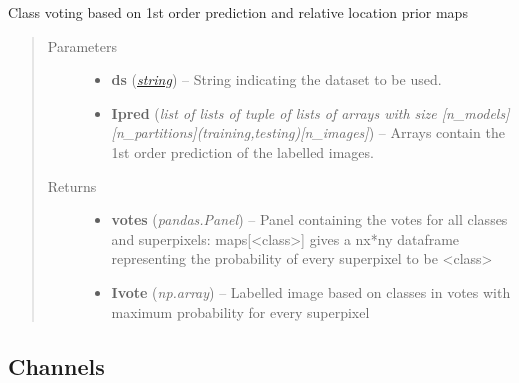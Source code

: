 \documentclass[letterpaper,10pt,english]{sphinxmanual}
\begin{document}
\begin{fulllineitems}
\label{classification:flamingo.classification.features.relativelocation.vote_image}
Class voting based on 1st order prediction and relative location prior maps
\begin{quote}\begin{description}
\item[{Parameters}] \leavevmode\begin{itemize}
\item {} 
\textbf{ds} (\href{http://docs.python.org/library/string.html\#module-string}{\emph{string}}) -- String indicating the dataset to be used.

\item {} 
\textbf{Ipred} (\emph{list of lists of tuple of lists of arrays with size {[}n\_models{]}{[}n\_partitions{]}(training,testing){[}n\_images{]}}) -- Arrays contain the 1st order prediction of the labelled images.

\end{itemize}

\item[{Returns}] \leavevmode
\begin{itemize}
\item {} 
\textbf{votes} (\emph{pandas.Panel}) --
Panel containing the votes for all classes and superpixels: maps{[}\textless{}class\textgreater{}{]}
gives a nx*ny dataframe representing the probability of every superpixel to be \textless{}class\textgreater{}

\item {} 
\textbf{Ivote} (\emph{np.array}) --
Labelled image based on classes in votes with maximum probability for every superpixel

\end{itemize}


\end{description}\end{quote}

\end{fulllineitems}



\subsection{Channels}
\label{classification:channels}\label{classification:module-flamingo.classification.channels}
\end{document}
